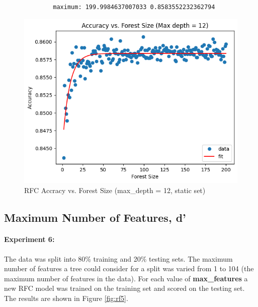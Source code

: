 \documentclass[12pt, letterpaper]{article}
\begin{document}
\begin{figure}[ht]
    \centering
    \begin{verbatim}
        maximum: 199.9984637007033 0.8583552232362794
    \end{verbatim}
    \includegraphics[width=\textwidth]{rf/rf6.png} %
    \caption{RFC Accracy vs. Forest Size (max\_depth = 12, static set)}
    \label{fig:rf4}
\end{figure}
\pagebreak

\subsection{Maximum Number of Features, d'}
\paragraph*{Experiment 6:}The data was split into 80\% training and 20\% testing
sets. The maximum number of features a tree could consider for a split was varied
from 1 to 104 (the maximum number of features in the data). For each value of 
\textbf{max\_features} a new RFC model was trained on the training set and scored
on the testing set. The results are shown in Figure \ref{fig:rf5}.

\end{document}
